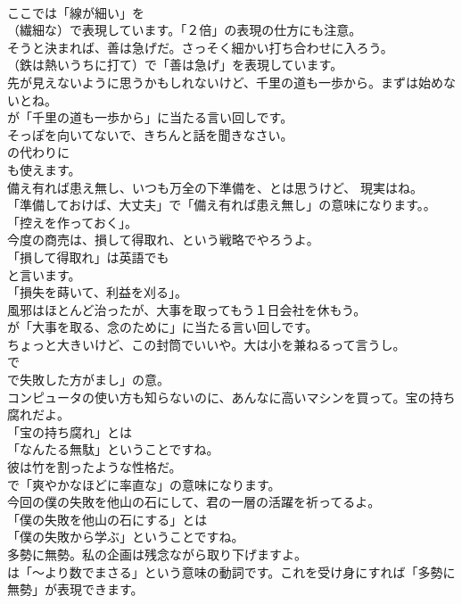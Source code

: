 \documentclass[8pt]{extreport}
\begin{document}
\begin{CJK}{UTF8}{min}
\\	ここでは「線が細い」を 
\\	（繊細な）で表現しています。「２倍」の表現の仕方にも注意。	
\\	そうと決まれば、善は急げだ。さっそく細かい打ち合わせに入ろう。 
\\	（鉄は熱いうちに打て）で「善は急げ」を表現しています。	
\\	先が見えないように思うかもしれないけど、千里の道も一歩から。まずは始めないとね。 
\\	が「千里の道も一歩から」に当たる言い回しです。	
\\	そっぽを向いてないで、きちんと話を聞きなさい。 
\\	の代わりに 
\\	も使えます。	
\\	備え有れば患え無し、いつも万全の下準備を、とは思うけど、 現実はね。 
\\	「準備しておけば、大丈夫」で「備え有れば患え無し」の意味になります。。
\\	「控えを作っておく」。	
\\	今度の商売は、損して得取れ、という戦略でやろうよ。 
\\	「損して得取れ」は英語でも
\\	と言います。
\\	「損失を蒔いて、利益を刈る」。	
\\	風邪はほとんど治ったが、大事を取ってもう１日会社を休もう。 
\\	が「大事を取る、念のために」に当たる言い回しです。	
\\	ちょっと大きいけど、この封筒でいいや。大は小を兼ねるって言うし。 
\\	で
\\	で失敗した方がまし」の意。	
\\	コンピュータの使い方も知らないのに、あんなに高いマシンを買って。宝の持ち腐れだよ。 
\\	「宝の持ち腐れ」とは
\\	「なんたる無駄」ということですね。	
\\	彼は竹を割ったような性格だ。 
\\	で「爽やかなほどに率直な」の意味になります。	
\\	今回の僕の失敗を他山の石にして、君の一層の活躍を祈ってるよ。 
\\	「僕の失敗を他山の石にする」とは
\\	「僕の失敗から学ぶ」ということですね。	
\\	多勢に無勢。私の企画は残念ながら取り下げますよ。 
\\	は「～より数でまさる」という意味の動詞です。これを受け身にすれば「多勢に無勢」が表現できます。	

\end{CJK}
\end{document}
